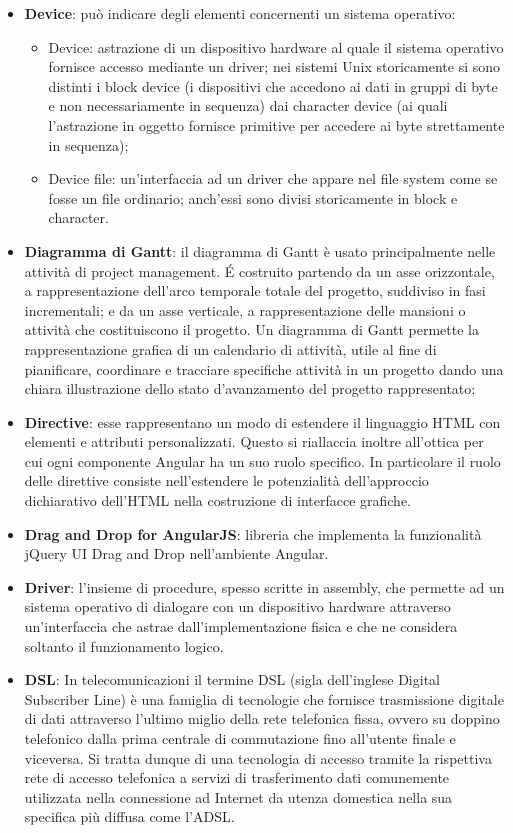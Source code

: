 \begin{itemize}
	\item
	\textbf{Device}: può indicare degli elementi concernenti un sistema operativo:
	 \begin{itemize} 
	\item Device: astrazione di un dispositivo hardware al quale il sistema operativo fornisce accesso mediante un driver; nei sistemi Unix storicamente si sono distinti i block device (i dispositivi che accedono ai dati in gruppi di byte e non necessariamente in sequenza) dai character device (ai quali l'astrazione in oggetto fornisce primitive per accedere ai byte strettamente in sequenza);
 	\item Device file: un'interfaccia ad un driver che appare nel file system come se fosse un file ordinario; anch'essi sono divisi storicamente in block e character.
	\end{itemize}
	\item
	\textbf{Diagramma di Gantt}: il diagramma di Gantt è usato principalmente nelle attività di project management. \'E costruito partendo da un asse orizzontale, a rappresentazione dell'arco temporale totale del progetto, suddiviso in fasi incrementali; e da un asse verticale, a rappresentazione delle mansioni o attività che costituiscono il progetto.
	Un diagramma di Gantt permette la rappresentazione grafica di un calendario di attività, utile al fine di pianificare, coordinare e tracciare specifiche attività in un progetto dando una chiara illustrazione dello stato d'avanzamento del progetto rappresentato;
	\item
	\textbf{Directive}: esse rappresentano un modo di estendere il linguaggio HTML con elementi e attributi personalizzati. Questo si riallaccia inoltre all’ottica per cui ogni componente Angular ha un suo ruolo specifico. In particolare il ruolo delle direttive consiste nell’estendere le potenzialità dell’approccio dichiarativo dell’HTML nella costruzione di interfacce grafiche.
	\item
	\textbf{Drag and Drop for AngularJS}: libreria che implementa la funzionalità jQuery UI Drag and Drop nell'ambiente Angular.
	\item
	\textbf{Driver}: l'insieme di procedure, spesso scritte in assembly, che permette ad un sistema operativo di dialogare con un dispositivo hardware attraverso un'interfaccia che astrae dall'implementazione fisica e che ne considera soltanto il funzionamento logico.
	\item
	\textbf{DSL}: In telecomunicazioni il termine DSL (sigla dell'inglese Digital Subscriber Line) è una famiglia di tecnologie che fornisce trasmissione digitale di dati attraverso l'ultimo miglio della rete telefonica fissa, ovvero su doppino telefonico dalla prima centrale di commutazione fino all'utente finale e viceversa.
	Si tratta dunque di una tecnologia di accesso tramite la rispettiva rete di accesso telefonica a servizi di trasferimento dati comunemente utilizzata nella connessione ad Internet da utenza domestica nella sua specifica più diffusa come l'ADSL. 
\end{itemize}